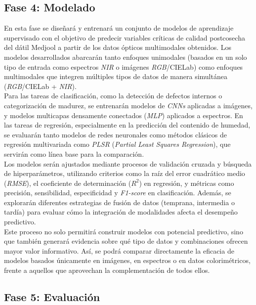 \subsection{Fase 4: Modelado}

En esta fase se diseñará y entrenará un conjunto de modelos de aprendizaje supervisado con el objetivo de predecir variables críticas de calidad postcosecha del dátil Medjool a partir de los datos ópticos multimodales obtenidos. Los modelos desarrollados abarcarán tanto enfoques unimodales (basados en un solo tipo de entrada como espectros \textit{NIR} o imágenes \textit{RGB}/CIELab) como enfoques multimodales que integren múltiples tipos de datos de manera simultánea (\textit{RGB}/CIELab + \textit{NIR}).\\

Para las tareas de clasificación, como la detección de defectos internos o categorización de madurez, se entrenarán modelos de \textit{CNNs} aplicadas a imágenes, y modelos multicapas densamente conectados (\textit{MLP}) aplicados a espectros. En las tareas de regresión, especialmente en la predicción del contenido de humedad, se evaluarán tanto modelos de redes neuronales como métodos clásicos de regresión multivariada como \textit{PLSR} (\textit{Partial Least Squares Regression}), que servirán como línea base para la comparación.\\

Los modelos serán ajustados mediante procesos de validación cruzada y búsqueda de hiperparámetros, utilizando criterios como la raíz del error cuadrático medio (\textit{RMSE}), el coeficiente de determinación (\textit{$R^2$}) en regresión, y métricas como precisión, sensibilidad, especificidad y \textit{F1-score} en clasificación. Además, se explorarán diferentes estrategias de fusión de datos (temprana, intermedia o tardía) para evaluar cómo la integración de modalidades afecta el desempeño predictivo.\\

Este proceso no solo permitirá construir modelos con potencial predictivo, sino que también generará evidencia sobre qué tipo de datos y combinaciones ofrecen mayor valor informativo. Así, se podrá comparar directamente la eficacia de modelos basados únicamente en imágenes, en espectros o en datos colorimétricos, frente a aquellos que aprovechan la complementación de todos ellos.

\subsection{Fase 5: Evaluación}

